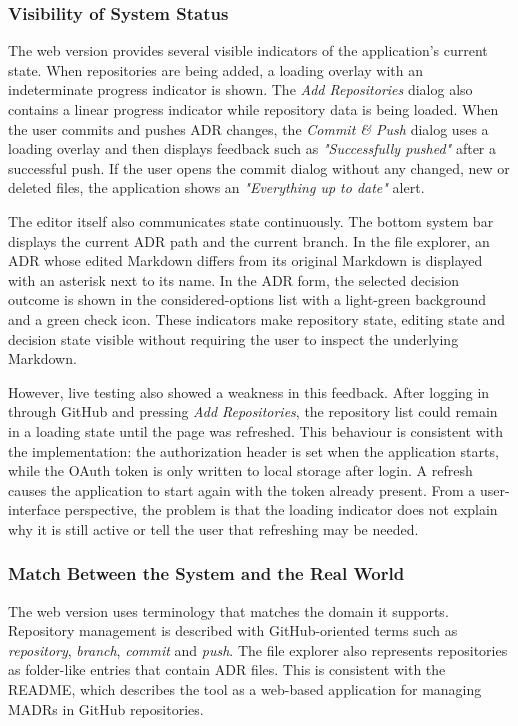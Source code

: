 \documentclass{article}
\begin{document}
\subsubsection{Visibility of System Status}
The web version provides several visible indicators of the application's current state. When repositories are being added, a loading overlay with an indeterminate progress indicator is shown. The \textit{Add Repositories} dialog also contains a linear progress indicator while repository data is being loaded. When the user commits and pushes ADR changes, the \textit{Commit \& Push} dialog uses a loading overlay and then displays feedback such as \textit{"Successfully pushed"} after a successful push. If the user opens the commit dialog without any changed, new or deleted files, the application shows an \textit{"Everything up to date"} alert.

The editor itself also communicates state continuously. The bottom system bar displays the current ADR path and the current branch. In the file explorer, an ADR whose edited Markdown differs from its original Markdown is displayed with an asterisk next to its name. In the ADR form, the selected decision outcome is shown in the considered-options list with a light-green background and a green check icon. These indicators make repository state, editing state and decision state visible without requiring the user to inspect the underlying Markdown.

However, live testing also showed a weakness in this feedback. After logging in through GitHub and pressing \textit{Add Repositories}, the repository list could remain in a loading state until the page was refreshed. This behaviour is consistent with the implementation: the authorization header is set when the application starts, while the OAuth token is only written to local storage after login. A refresh causes the application to start again with the token already present. From a user-interface perspective, the problem is that the loading indicator does not explain why it is still active or tell the user that refreshing may be needed.

\subsubsection{Match Between the System and the Real World}
The web version uses terminology that matches the domain it supports. Repository management is described with GitHub-oriented terms such as \textit{repository}, \textit{branch}, \textit{commit} and \textit{push}. The file explorer also represents repositories as folder-like entries that contain ADR files. This is consistent with the README, which describes the tool as a web-based application for managing MADRs in GitHub repositories.
\end{document}
